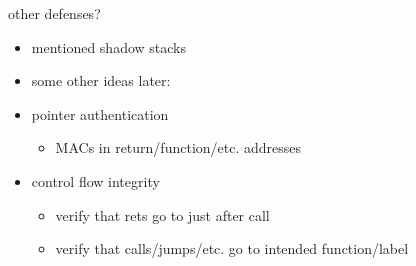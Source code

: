 \begin{frame}{other defenses?}
    \begin{itemize}
    \item mentioned shadow stacks
    \vspace{.5cm}
    \item some other ideas later:
    \item pointer authentication
        \begin{itemize}
        \item MACs in return/function/etc. addresses
        \end{itemize}
    \item control flow integrity
        \begin{itemize}
        \item verify that rets go to just after call
        \item verify that calls/jumps/etc. go to intended function/label
        \end{itemize}
    \end{itemize}
\end{frame}
